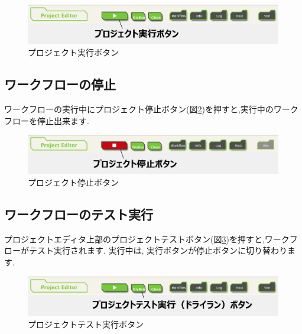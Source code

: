 \documentclass[a4paper,10pt,oneside]{jsbook}
\begin{document}
\begin{figure}[H]
	\begin{center}
		\includegraphics[width=12.0cm]{image/execute_project_button.png}
	\end{center}
	\caption{プロジェクト実行ボタン}
	\label{fig:execute_project_button}
\end{figure}

\subsection{ワークフローの停止}
ワークフローの実行中にプロジェクト停止ボタン(図\ref{fig:stop_project_button})を押すと,実行中のワークフローを停止出来ます.

\begin{figure}[H]
	\begin{center}
		\includegraphics[width=12.0cm]{image/stop_project_button.png}
	\end{center}
	\caption{プロジェクト停止ボタン}
	\label{fig:stop_project_button}
\end{figure}

\subsection{ワークフローのテスト実行}
プロジェクトエディタ上部のプロジェクトテストボタン(図\ref{fig:dryrun_project_button})を押すと,ワークフローがテスト実行されます. 実行中は, 実行ボタンが停止ボタンに切り替わります.

\begin{figure}[H]
	\begin{center}
		\includegraphics[width=12.0cm]{image/dryrun_project_button.png}
	\end{center}
	\caption{プロジェクトテスト実行ボタン}
	\label{fig:dryrun_project_button}
\end{figure}
\end{document}
